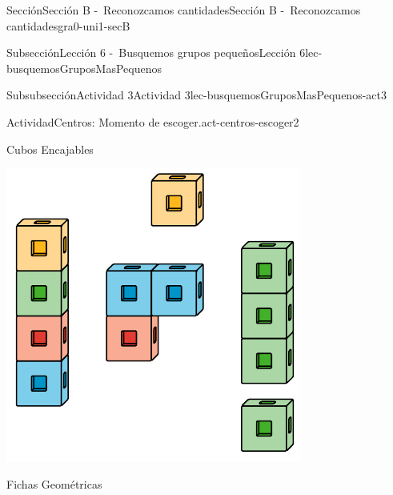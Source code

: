 \documentclass[twoside,10pt,]{article}
\begin{document}
\begin{sectionptx}{Sección}{Sección B -~Reconozcamos cantidades}{}{Sección B -~Reconozcamos cantidades}{}{}{gra0-uni1-secB}
\begin{subsectionptx}{Subsección}{Lección 6 -~Busquemos grupos pequeños}{}{Lección 6}{}{}{lec-busquemosGruposMasPequenos}
\begin{subsubsectionptx}{Subsubsección}{Actividad 3}{}{Actividad 3}{}{}{lec-busquemosGruposMasPequenos-act3}
\begin{activity}{Actividad}{Centros: Momento de escoger.}{act-centros-escoger2}%
\begin{sidebyside}{2}{0.025}{0.025}{0.05}%
\begin{sbspanel}{0.45}%
Cubos Encajables%
\par
\includegraphics[width=\linewidth]{external/svg-source/tikz-file-128850.pdf}
\end{sbspanel}%
\begin{sbspanel}{0.45}%
Fichas Geométricas%
\par

\end{sbspanel}
\end{sidebyside}
\end{activity}
\end{subsubsectionptx}
\end{subsectionptx}
\end{sectionptx}
\end{document}
